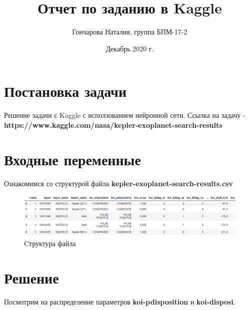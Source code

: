 \documentclass[a4paper,14pt]{article}
\title{Отчет по заданию в Kaggle}
\author{Гончарова Наталия, группа БПМ-17-2}
\date{Декабрь 2020 г.}
\begin{document}
\maketitle

\section{Постановка задачи}
Решение задачи с Kaggle с исползованием нейронной сети.
Ссылка на задачу - \textbf{https://www.kaggle.com/nasa/kepler-exoplanet-search-results}

\section{Входные переменные}
Ознакомимся со структурой файла \textbf{kepler-exoplanet-search-results.csv}

\begin{figure}[h!]
\centering
\includegraphics[scale=0.6]{pics/1.png}
\caption{Cтруктура файла}
\end{figure}

\section{Решение}
Посмотрим на распределение параметров \textbf{koi-pdisposition} и \textbf{koi-disposi}.
\end{document}
